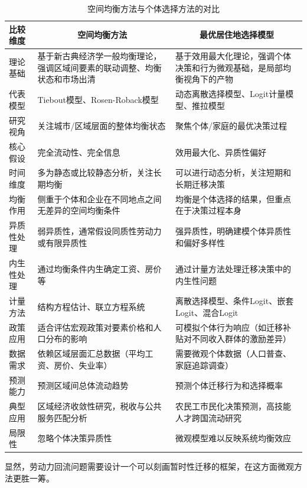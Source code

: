 \documentclass[a4paper,12pt,oneside, fontset=mac]{ctexbook} %
\begin{document}
\begin{table}[!ht]
\centering
\caption{空间均衡方法与个体选择方法的对比}
\label{tab:空间均衡方法与个体选择方法的对比}
\begin{tabularx}{\textwidth}{@{}lXX@{}} 
\toprule
\textbf{比较维度} & \multicolumn{1}{c}{\textbf{空间均衡方法}} & \multicolumn{1}{c}{\textbf{最优居住地选择模型}} \\ \midrule
理论基础 & 基于新古典经济学一般均衡理论，强调区域间要素的联动调整、均衡状态和市场出清 & 基于效用最大化理论，强调个体决策和行为微观基础，是局部均衡视角下的产物 \\
代表模型 & Tiebout模型、Rosen-Roback模型 & 动态离散选择模型、Logit计量模型、推拉模型 \\
研究视角 & 关注城市/区域层面的整体均衡状态 & 聚焦个体/家庭的最优决策过程 \\
核心假设 & 完全流动性、完全信息 & 效用最大化、异质性偏好 \\
时间维度 & 多为静态或比较静态分析，关注长期均衡 & 可以进行动态分析，关注短期和长期迁移决策 \\
均衡作用 & 侧重于个体和企业在不同地点之间无差异的空间均衡条件 & 均衡是个体选择的结果，但重点在于决策过程本身 \\
异质性处理 & 弱异质性，通常假设同质性劳动力或有限异质性 & 强异质性，明确建模个体异质性和偏好多样性 \\
内生性处理 & 通过均衡条件内生确定工资、房价等 & 通过计量方法处理迁移决策中的内生性问题 \\
计量方法 & 结构方程估计、联立方程系统 & 离散选择模型、条件Logit、嵌套Logit、混合Logit \\
政策应用 & 适合评估宏观政策对要素价格和人口分布的影响 & 可模拟个体行为响应（如迁移补贴对不同收入群体的激励差异） \\
数据需求 & 依赖区域层面汇总数据（平均工资、房价、失业率） & 需要微观个体数据（人口普查、家庭追踪调查） \\
预测能力 & 预测区域间总体流动趋势 & 预测个体迁移行为和选择概率 \\
典型应用 & 区域经济收敛性研究，税收与公共服务匹配分析 & 农民工市民化决策预测，高技能人才跨国流动研究 \\
局限性 & 忽略个体决策异质性 & 微观模型难以反映系统均衡效应 \\ 
\bottomrule
\end{tabularx}
\end{table}


显然，劳动力回流问题需要设计一个可以刻画暂时性迁移的框架，在这方面微观方法更胜一筹。
\end{document}
